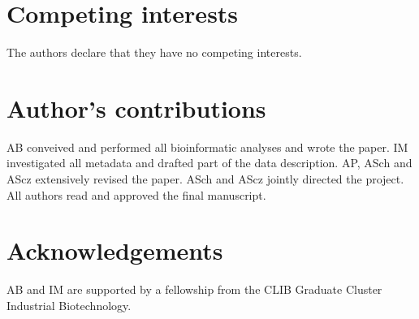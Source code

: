 \documentclass{bmcart}
\begin{document}
\begin{backmatter}

\section*{Competing interests}
The authors declare that they have no competing interests.

\section*{Author's contributions}
AB conveived and performed all bioinformatic analyses and wrote the paper.
IM investigated all metadata and drafted part of the data description.
AP, ASch and AScz extensively revised the paper.
ASch and AScz jointly directed the project.
All authors read and approved the final manuscript.

\section*{Acknowledgements}
AB and IM are supported by a fellowship from the CLIB Graduate Cluster Industrial Biotechnology.




\end{backmatter}
\end{document}
